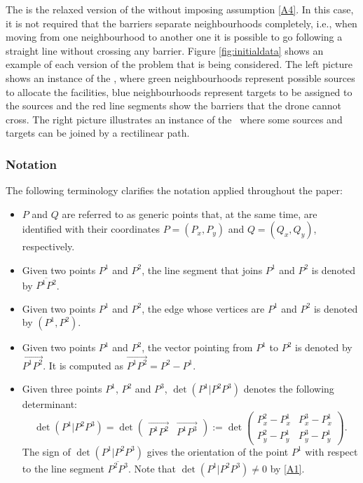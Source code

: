 \documentclass[a4paper,  review, authoryear, 1p.]{elsarticle}
\newcommand{\KMPHN}{{\sf{H-KMPHN}}}
\newcommand{\KMPN}{{\sf{H-KMPN}\xspace }}
\newcommand{\segment}[2]{\overline{#1#2}}
\newcommand{\determinant}[3]{\det({#1|#2#3})}
\begin{document}
	The \KMPN\xspace is the relaxed version of the \KMPHN\xspace without imposing assumption \ref{A4}. In this case, it is not required that the barriers separate neighbourhoods completely, i.e., when moving from one neighbourhood to another one it is possible to go following a straight line without crossing any barrier. Figure \ref{fig:initialdata} shows an example of each version of the problem that is being considered. The left picture shows an instance of the \KMPHN, where green neighbourhoods represent possible sources to allocate the facilities, blue neighbourhoods represent targets to be assigned to the sources and the red line segments show the barriers that the drone cannot cross. The right picture illustrates an instance of the \KMPN \ where some sources and targets can be joined by a rectilinear path.
	
	
	
	\subsubsection*{Notation} 
	
	The following terminology clarifies the notation applied throughout the paper: 
	\begin{itemize}
		\item $P$ and $Q$ are referred to as generic points that, at the same time, are identified with their coordinates $P=(P_x, P_y)$ and $Q=(Q_x, Q_y)$, respectively.
		\item Given two points $P^1$ and $P^2$, the line segment that joins $P^1$ and $P^2$ is denoted by $\segment{P^1}{P^2}$.
		\item  Given two points $P^1$ and $P^2$, the edge whose vertices are $P^1$ and $P^2$ is denoted by $(P^1, P^2)$.
		\item  Given two points $P^1$ and $P^2$, the vector pointing from $P^1$ to $P^2$ is denoted by $\overrightarrow{P^1P^2}$. It is computed as
		$\overrightarrow{P^1P^2}=P^2-P^1.$
		\item Given three points $P^1$, $P^2$ and $P^3$, $\determinant{P^1}{P^2}{P^3}$ denotes the following determinant:
		$$
		\determinant{P^1}{P^2}{P^3}=\det\left(\begin{array}{c|c} \overrightarrow{P^1P^2} & \overrightarrow{P^1P^3}\end{array}\right):=\det\left( \begin{array}{cc}  P^2_x-P^1_x & P^3_x-P^1_x \\ P_y^2-P^1_y & P_y^3-P_y^1 \end{array}\right).
		$$
		The sign of $\determinant{P^1}{P^2}{P^3}$ gives the orientation of the point $P^1$ with respect to the line segment $\segment{P^2}{P^3}.$ Note that $\determinant{P^1}{P^2}{P^3}\neq 0$ by \ref{A1}. 
	\end{itemize} 
		
\end{document}
